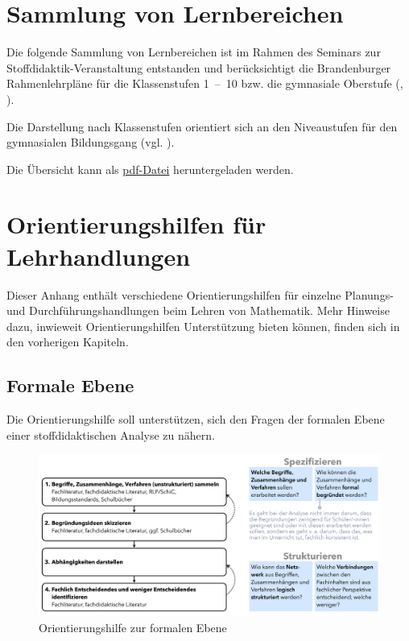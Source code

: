 \documentclass[
]{scrbook}
\theoremstyle{definition}
\theoremstyle{definition}
\theoremstyle{definition}
\theoremstyle{definition}
\theoremstyle{remark}
\begin{document}
\appendix


\chapter{Sammlung von Lernbereichen}\label{sammlung-von-lernbereichen}

Die folgende Sammlung von Lernbereichen ist im Rahmen des Seminars zur Stoffdidaktik-Veranstaltung entstanden und berücksichtigt die Brandenburger Rahmenlehrpläne für die Klassenstufen 1~--~10 bzw. die gymnasiale Oberstufe (, ).

Die Darstellung nach Klassenstufen orientiert sich an den Niveaustufen für den gymnasialen Bildungsgang (vgl. ).

Die Übersicht kann als \href{files/Stoffdidaktik2024-SammlungLernbereiche.pdf}{pdf-Datei} heruntergeladen werden.

\chapter{Orientierungshilfen für Lehrhandlungen}\label{orientierungshilfen-fuxfcr-lehrhandlungen}

Dieser Anhang enthält verschiedene Orientierungshilfen für einzelne Planungs- und Durchführungshandlungen beim Lehren von Mathematik. Mehr Hinweise dazu, inwieweit Orientierungshilfen Unterstützung bieten können, finden sich in den vorherigen Kapiteln.

\section{Formale Ebene}\label{formale-ebene-1}

Die Orientierungshilfe soll unterstützen, sich den Fragen der formalen Ebene einer stoffdidaktischen Analyse zu nähern.

\begin{figure}

{\centering \includegraphics[width=0.9\linewidth]{pictures/B-OrientierungshilfeFormaleEbene} 

}

\caption{Orientierungshilfe zur formalen Ebene}\label{fig:OrientierungFormal}
\end{figure}
\end{document}
